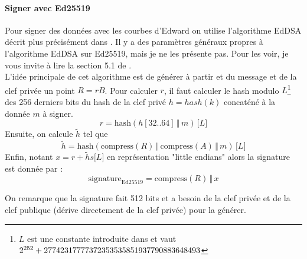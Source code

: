 \documentclass[a4paper, 12pt]{article}
\begin{document}
\paragraph{Signer avec Ed25519}\label{signerEd25519}
Pour signer des données avec les courbes d'Edward on utilise l'algorithme EdDSA décrit plus précisément dans \cite{eddsa}.
Il y a des paramètres généraux propres à l'algorithme EdDSA sur Ed25519, mais je ne les présente pas. Pour les voir, je vous invite à lire la section 5.1 de \cite{eddsa}.\\

L'idée principale de cet algorithme est de générer à partir et du message et de la clef privée un point $R = rB$.
Pour calculer $r$, il faut calculer le hash modulo $L$\footnote{$L$ est une constante introduite dans \cite{eddsa} et vaut $2^{252}+2774231777737235353585193779088364\\8493$} des 256 derniers bits du hash de la clef privé $h = hash(k)$ concaténé à la donnée $m$ à signer.
$$
r = \text{hash}\left(h[32..64] \, \hyperref[concat]{\Vert} \, m\right) \, \lbrack L \rbrack
$$
Ensuite, on calcule $\tilde{h}$ tel que
$$
\tilde{h} = \text{hash}\left(\text{compress}(R) \, \hyperref[concat]{\Vert} \, \text{compress}(A) \, \hyperref[concat]{\Vert} \, m\right) \, \lbrack L \rbrack
$$
Enfin, notant $x = r+\tilde{h}s \lbrack L \rbrack$ en représentation "little endians" alors la signature est donnée par :
$$
\text{signature}_{\text{Ed25519}} = \text{compress}(R) \, \hyperref[concat]{\Vert} \, x
$$

On remarque que la signature fait 512 bits et a besoin de la clef privée et de la clef publique (dérive directement de la clef privée) pour la générer.
\end{document}
